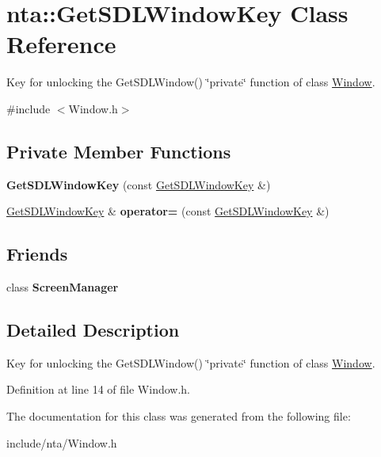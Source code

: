 \hypertarget{classnta_1_1GetSDLWindowKey}{}\section{nta\+:\+:Get\+S\+D\+L\+Window\+Key Class Reference}
\label{classnta_1_1GetSDLWindowKey}


Key for unlocking the Get\+S\+D\+L\+Window() \char`\"{}private\char`\"{} function of class \hyperlink{classnta_1_1Window}{Window}.  




{\ttfamily \#include $<$Window.\+h$>$}

\subsection*{Private Member Functions}
\begin{DoxyCompactItemize}
\item 
\mbox{\label{classnta_1_1GetSDLWindowKey_ae963466e80c61d0409855144ad8096e1}} 
{\bfseries Get\+S\+D\+L\+Window\+Key} (const \hyperlink{classnta_1_1GetSDLWindowKey}{Get\+S\+D\+L\+Window\+Key} \&)
\item 
\mbox{\label{classnta_1_1GetSDLWindowKey_a9753a4f5a30517dce3219a8877fe7cd8}} 
\hyperlink{classnta_1_1GetSDLWindowKey}{Get\+S\+D\+L\+Window\+Key} \& {\bfseries operator=} (const \hyperlink{classnta_1_1GetSDLWindowKey}{Get\+S\+D\+L\+Window\+Key} \&)
\end{DoxyCompactItemize}
\subsection*{Friends}
\begin{DoxyCompactItemize}
\item 
\mbox{\label{classnta_1_1GetSDLWindowKey_a888edc649fed896d28811ec69f3f2066}} 
class {\bfseries Screen\+Manager}
\end{DoxyCompactItemize}


\subsection{Detailed Description}
Key for unlocking the Get\+S\+D\+L\+Window() \char`\"{}private\char`\"{} function of class \hyperlink{classnta_1_1Window}{Window}. 

Definition at line 14 of file Window.\+h.



The documentation for this class was generated from the following file\+:\begin{DoxyCompactItemize}
\item 
include/nta/Window.\+h\end{DoxyCompactItemize}
